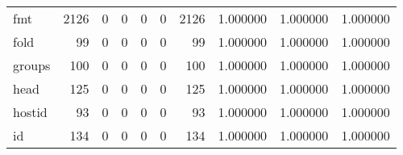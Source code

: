 \begin{longtable}{lrrrrrrrrr}
fmt       &                                               2126 &                                                  0 &                                                  0 &                                                  0 &                                                  0 &                                               2126 &                                           1.000000 &                               1.000000 &                             1.000000 \\
fold      &                                                 99 &                                                  0 &                                                  0 &                                                  0 &                                                  0 &                                                 99 &                                           1.000000 &                               1.000000 &                             1.000000 \\
groups    &                                                100 &                                                  0 &                                                  0 &                                                  0 &                                                  0 &                                                100 &                                           1.000000 &                               1.000000 &                             1.000000 \\
head      &                                                125 &                                                  0 &                                                  0 &                                                  0 &                                                  0 &                                                125 &                                           1.000000 &                               1.000000 &                             1.000000 \\
hostid    &                                                 93 &                                                  0 &                                                  0 &                                                  0 &                                                  0 &                                                 93 &                                           1.000000 &                               1.000000 &                             1.000000 \\
id        &                                                134 &                                                  0 &                                                  0 &                                                  0 &                                                  0 &                                                134 &                                           1.000000 &                               1.000000 &                             1.000000 \\

\end{longtable}
